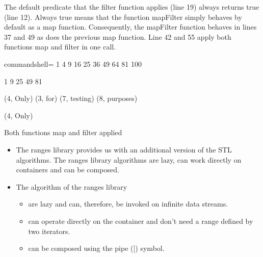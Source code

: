 The default predicate that the filter function applies (line 19) always returns true (line 12). Always true means that the function mapFilter simply behaves by default as a map function. Consequently, the mapFilter function behaves in lines 37 and 49 as does the previous map function. Line 42 and 55 apply both functions map and filter in one call.

\begin{tcblisting}{commandshell={}}
1 4 9 16 25 36 49 64 81 100
	
1 9 25 49 81

(4, Only) (3, for) (7, testing) (8, purposes)

(4, Only)
\end{tcblisting}

\begin{center}
Both functions map and filter applied
\end{center}

\begin{tcolorbox}[colback=mygreen!5!white,colframe=mygreen!75!black,title={Distilled Information}]
\begin{itemize}
\item 
The ranges library provides us with an additional version of the STL algorithms. The ranges library algorithms are lazy, can work directly on containers and can be composed.

\item 
The algorithm of the ranges library
\begin{itemize}
\item 
are lazy and can, therefore, be invoked on infinite data streams.

\item 
can operate directly on the container and don’t need a range defined by two iterators.

\item 
can be composed using the pipe (|) symbol.
\end{itemize}
\end{itemize}
\end{tcolorbox}	
	
	
	
	
	
	
	
	
	
	
	
	
	
	
	
	
	
	
	
	
	
	
	